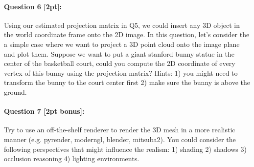 \documentclass[11pt]{article}
\begin{document}
\paragraph{Question 6 [2pt]:}
Using our estimated projection matrix in Q5, we could insert any 3D object in the world coordinate frame onto the 2D image. In this question, let's consider the a simple case where we want to project a 3D point cloud onto the image plane and plot them. Suppose we want to put a giant stanford bunny statue in the center of the basketball court, could you compute the 2D coordinate of every vertex of this bunny using the projection matrix? Hints: 1) you might need to transform the bunny to the court center first 2) make sure the bunny is above the ground. 

\paragraph{Question 7 [2pt bonus]:} Try to use an off-the-shelf renderer to render the 3D mesh in a more realistic manner (e.g. pyrender, moderngl, blender, mitsuba2). You could consider the following perspectives that might influence the realism: 1) shading 2) shadows 3) occlusion reasoning 4) lighting environments. 
\end{document}
